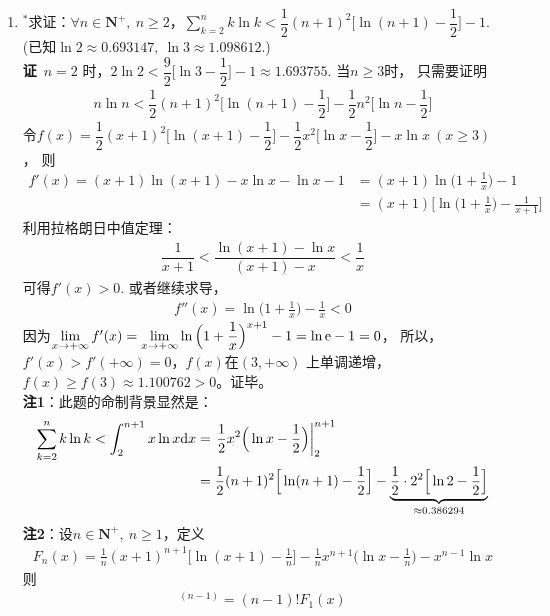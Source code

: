 \begin{enumerate}[label={【\textbf{例\thechapter.\arabic*}】},
 leftmargin=\inteval{\myenumleftmargin}pt,
 itemsep=\inteval{\myenumitempsep}pt,
 itemindent=\inteval{\myenumitemindent}pt]
\item $ ^* $求证：$ \forall n\in \textbf{N}^+,\ n\geq 2 $，$ \sum\limits_{k=2}^{n} 
k\ln k<\dfrac{1}{2}(n+1)^2\Big[\ln(n+1)-\dfrac{1}{2} \Big]-1 $. \\
(已知$ \ln 2\approx 0.693147,\ \ln 3\approx 1.098612 $.) \\
\textbf{证}\ $ n=2 $ 时，$ 2\ln 2<\dfrac{9}{2}\Big[\ln 3-
\dfrac{1}{2}\Big]-1\approx 1.693755 $. 当$ n\geq 3 $时，
只需要证明
\begin{gather*}
    n\ln n<\dfrac{1}{2}(n+1)^2\Big[\ln(n+1)-\dfrac{1}{2} 
    \Big]-\dfrac{1}{2}n^2\Big[\ln n-\dfrac{1}{2} \Big] 
\end{gather*}
令$ f(x)=\dfrac{1}{2}(x+1)^2\Big[\ln(x+1)-\dfrac{1}{2} 
\Big]-\dfrac{1}{2}x^2\Big[\ln x-\dfrac{1}{2} \Big]-x\ln x\ 
(x\geq 3) $，
则
\begin{align*}
    f'(x) =(x+1)\ln(x+1)-x\ln x-\ln x-1 &=
    (x+1)\ln\Big(1+\frac{1}{x}\Big)-1\\
    &=(x+1)\Big[\ln\Big(1+\frac{1}{x}\Big)-\frac{1}{x+1}\Big]
\end{align*}
利用拉格朗日中值定理：
\begin{gather*}
    \dfrac{1}{x+1}<\dfrac{\ln(x+1)-\ln x}{(x+1)-x}<\dfrac{1}{x}
\end{gather*}
可得$ f'(x)>0 $. 或者继续求导，
\begin{align*}
    f''(x)=\ln\Big(1+\frac{1}{x}\Big)-\frac{1}{x}<0
\end{align*}
因为$ \lim\limits_{x\to+\infty}f'(x)=\lim\limits_{x\to+\infty}
\ln\Big(1+\dfrac{1}{x}\Big)^{x+1}-1=\ln \mathrm{e}-1=0 $，
所以，$ f'(x)>f'(+\infty)=0 $，$ f(x) $在$ (3,+\infty) $
上单调递增，$ f(x)\geq f(3)\approx 1.100762>0 $。证毕。\\
\textbf{注1}：此题的命制背景显然是：
\begin{align*}
    \sum\limits_{k=2}^{n} k\ln k<\int_2^{n+1}x\ln x\mathrm{d} x &=
    \left.\dfrac{1}{2}x^2\Big(\ln x-\dfrac{1}{2}\Big)\right|_2^{n+1} \\
    &=\dfrac{1}{2}(n+1)^2\Big[\ln(n+1)-\dfrac{1}{2} \Big]
    -\underbrace{\dfrac{1}{2}\cdot2^2\Big[\ln 2-\dfrac{1}{2} 
        \Big]}_{\approx 0.386294 }
\end{align*}
\textbf{注2}：设$  n\in \textbf{N}^+,\ n\geq 1 $，定义
\begin{gather*}
    F_n(x)=\frac{1}{n}(x+1)^{n+1}\Big[\ln (x+1)-\frac{1}{n}\Big]
    -\frac{1}{n}x^{n+1}\Big(\ln x-\frac{1}{n}\Big)-x^{n-1}\ln x
\end{gather*}
则
\begin{gather*}
    [F_n(x)]^{(n-1)}=(n-1)!F_1(x)

\end{gather*}
\end{enumerate}
